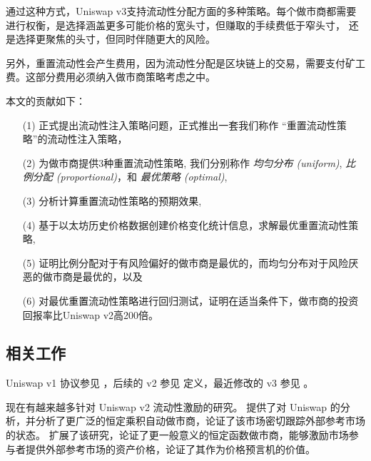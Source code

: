 \documentclass[sigconf, dvipsnames]{acmart}
\begin{document}
通过这种方式，Uniswap v3支持流动性分配方面的多种策略。每个做市商都需要进行权衡，是选择涵盖更多可能价格的宽头寸，但赚取的手续费低于窄头寸，
还是选择更聚焦的头寸，但同时伴随更大的风险。

另外，重置流动性会产生费用，因为流动性分配是区块链上的交易，需要支付矿工费。这部分费用必须纳入做市商策略考虑之中。

本文的贡献如下：
\begin{enumerate}
    \item[(1)] 正式提出流动性注入策略问题，正式推出一套我们称作 ``重置流动性策略''的流动性注入策略，
    \item[(2)] 为做市商提供3种重置流动性策略, 我们分别称作 \textit{均匀分布 (uniform)}, \textit{比例分配 (proportional)}，和 \textit{最优策略 (optimal)},
    \item[(3)] 分析计算重置流动性策略的预期效果, 
    \item[(4)] 基于以太坊历史价格数据创建价格变化统计信息，求解最优重置流动性策略,
    \item[(5)] 证明比例分配对于有风险偏好的做市商是最优的，而均匀分布对于风险厌恶的做市商是最优的，以及
    \item[(6)] 对最优重置流动性策略进行回归测试，证明在适当条件下，做市商的投资回报率比Uniswap v2高200倍。
\end{enumerate}


\subsection{相关工作}
\quad Uniswap v1 协议参见 \citet{uniswapv1white} ，后续的 v2 参见 \cite{adams2020uniswap} 定义，最近修改的 v3 参见 \citet{adams2021uniswap}。
%

现在有越来越多针对 Uniswap v2 流动性激励的研究。
\citet{angeris2019analysis} 提供了对 Uniswap 的分析，并分析了更广泛的恒定乘积自动做市商，论证了该市场密切跟踪外部参考市场的状态。
\citet{angeris2020improved} 扩展了该研究，论证了更一般意义的恒定函数做市商，能够激励市场参与者提供外部参考市场的资产价格，论证了其作为价格预言机的价值。
\end{document}
